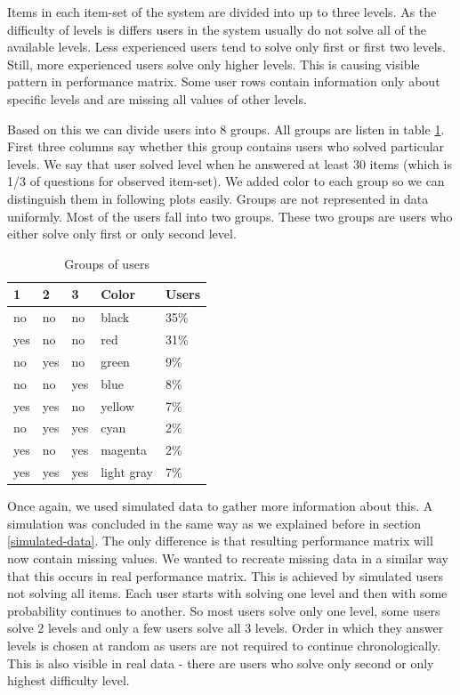 \documentclass[
  digital, %
  table,   %
  nolof,     %
  nolot,     %
  nocover,
  color
]{fithesis3}
\begin{document}

Items in each item-set of the system are divided into up to three levels. As the difficulty of levels is differs users in the system usually do not solve all of the available levels. Less experienced users tend to solve only first or first two levels. Still, more experienced users solve only higher levels. This is causing visible pattern in performance matrix. Some user rows contain information only about specific levels and are missing all values of other levels.

Based on this we can divide users into 8 groups. All groups are listen in table \ref{tab:user-groups}. First three columns say whether this group contains users who solved particular levels. We say that user solved level when he answered at least 30 items (which is 1/3 of questions for observed item-set). We added color to each group so we can distinguish them in following plots easily. Groups are not represented in data uniformly. Most of the users fall into two groups. These two groups are users who either solve only first or only second level.

\begin{table}
  \begin{tabular}{ | l | l | l | l | l | }
    \hline
      1   & 2   & 3   & Color      & Users \\ \hline
      no  & no  & no  & black      & 35\%  \\ \hline
      yes & no  & no  & red        & 31\%  \\ \hline
      no  & yes & no  & green      & 9\%   \\ \hline
      no  & no  & yes & blue       & 8\%   \\ \hline
      yes & yes & no  & yellow     & 7\%   \\ \hline
      no  & yes & yes & cyan       & 2\%   \\ \hline
      yes & no  & yes & magenta    & 2\%   \\ \hline
      yes & yes & yes & light gray & 7\%   \\ \hline
  \end{tabular}
  \caption{Groups of users}
  \label{tab:user-groups}
\end{table}


Once again, we used simulated data to gather more information about this. A simulation was concluded in the same way as we explained before in section \ref{simulated-data}. The only difference is that resulting performance matrix will now contain missing values. We wanted to recreate missing data in a similar way that this occurs in real performance matrix. This is achieved by simulated users not solving all items. Each user starts with solving one level and then with some probability continues to another. So most users solve only one level, some users solve 2 levels and only a few users solve all 3 levels. Order in which they answer levels is chosen at random as users are not required to continue chronologically. This is also visible in real data - there are users who solve only second or only highest difficulty level.
\end{document}
